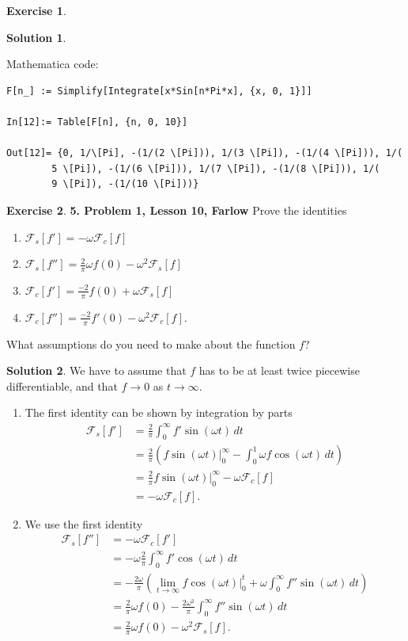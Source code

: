 \documentclass{article}
\theoremstyle{definition}
\newtheorem*{exer*}{Exercise}
\newtheorem*{sln*}{Solution}
\newcommand{\F}{\mathcal{F}}
\begin{document}
\begin{exer*}
\begin{sln*}
\begin{enumerate}
			Mathematica code:
			\begin{lstlisting}
F[n_] := Simplify[Integrate[x*Sin[n*Pi*x], {x, 0, 1}]]
			
In[12]:= Table[F[n], {n, 0, 10}]
			
Out[12]= {0, 1/\[Pi], -(1/(2 \[Pi])), 1/(3 \[Pi]), -(1/(4 \[Pi])), 1/(
		5 \[Pi]), -(1/(6 \[Pi])), 1/(7 \[Pi]), -(1/(8 \[Pi])), 1/(
		9 \[Pi]), -(1/(10 \[Pi]))}
			\end{lstlisting}
		\end{enumerate}
	\end{sln*}
\end{exer*}





\newpage

\begin{exer*}\textbf{5. Problem 1, Lesson 10, Farlow}
	Prove the identities
	\begin{enumerate}
		\item $\F_s[f'] = -\omega \F_c[f]$\\
		\item $\F_s[f''] = \frac{2}{\pi}\omega f(0) - \omega^2 \F_s[f]$\\
		\item $\F_c[f'] = \frac{-2}{\pi}f(0) + \omega\F_s[f]$\\
		\item $\F_c[f''] = \frac{-2}{\pi}f'(0) - \omega^2 \F_c[f]$.
	\end{enumerate}
	What assumptions do you need to make about the function $f$?
\begin{sln*}
	We have to assume that $f$ has to be at least twice piecewise differentiable, and that $f\to 0$ as $t\to \infty$.   
	\begin{enumerate}
		\item The first identity can be shown by integration by parts
		\begin{align*}
		\F_s[f'] &= \frac{2}{\pi}\int^\infty_0 f'\sin(\omega t)\,dt\\
		&= \frac{2}{\pi}\left( f\sin(\omega t)\bigg\vert^\infty_0 - \int^1_0 \omega f\cos(\omega t)\,dt \right)\\
		&= \frac{2}{\pi}f\sin(\omega t)\bigg\vert_0^\infty - \omega \F_c[f]\\
		&= -\omega \F_c[f].
		\end{align*}
		
		
		\item We use the first identity
		\begin{align*}
		 \F_s[f''] &= -\omega\F_c[f']\\
		 &= -\omega \frac{2}{\pi}\int^\infty_0 f'\cos(\omega t)\,dt\\
		 &= -\frac{2\omega}{\pi}\left( \lim_{t\to \infty} f\cos(\omega t)\bigg\vert^t_0 + \omega \int^\infty_0  f'' \sin(\omega t)\,dt  \right)\\
		 &= \frac{2}{\pi}\omega f(0) - \frac{2\omega^2}{\pi}\int^\infty_0 f''\sin(\omega t)\,dt\\
		 &= \frac{2}{\pi}\omega f(0) - \omega^2 \F_s[f].
		\end{align*}
		

\end{enumerate}
\end{sln*}
\end{exer*}
\end{document}
